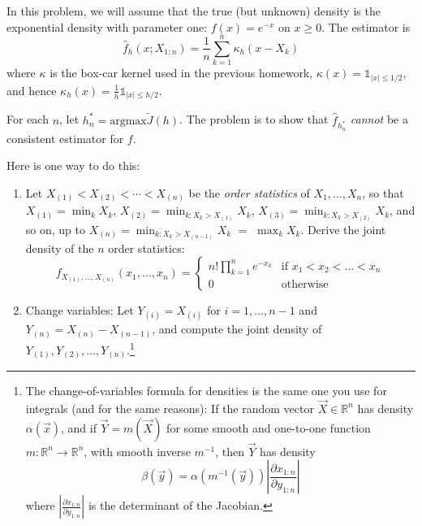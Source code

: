 \documentclass[11pt]{report}
\newcommand{\ind}{{\mathds{1}}}
\begin{document}
\begin{enumerate}[1.]
          In this problem, we will assume that the true (but unknown) density is the exponential density with parameter one: $f(x)=e^{-x}$ on $x \geq 0$. The estimator is
          \[
              \hat{f}_h(x;X_{1:n})=\frac{1}{n}\sum_{k=1}^n \kappa_h(x-X_k)
          \]
          where $\kappa$ is
          the box-car kernel used in the previous homework, $\kappa(x) = \ind_{|x|\leq 1/2}$, and hence
          $\kappa_h(x)=\frac{1}{h}\ind_{|x|\leq h/2}$.

          For each $n$, let $h_n^* = \text{argmax} \tilde{J}(h)$. The problem is to show that $\hat{f}_{h_n^*}$ {\em cannot} be a consistent estimator for $f$.

          Here is one way to do this:
          \begin{enumerate}

              \item Let $X_{(1)}<X_{(2)}<\cdots<X_{(n)}$ be the {\em order statistics}
                    of $X_1,\ldots,X_n$, so that $\displaystyle X_{(1)}=\min_k X_k$,
                    $\displaystyle X_{(2)}=\min_{k:X_k>X_{(1)}} X_k$,
                    $\displaystyle X_{(3)}=\min_{k:X_k>X_{(2)}} X_k$,
                    and so on, up to
                    $\displaystyle X_{(n)}=\min_{k:X_k>X_{(n-1)}} X_k$ $=$
                    $\displaystyle \max_k X_k$.
                    Derive the joint density of the $n$ order statistics:
                    $$
                        f_{X_{(1)},\ldots,X_{(n)}}(x_1,\ldots,x_n)=
                        \left\{
                        \begin{array}{ll}
                            n! \prod_{k=1}^n e^{-x_k} & \mbox{if $x_1<x_2<\ldots <x_n$} \\
                            0                         & \mbox{otherwise}
                        \end{array}
                        \right.
                    $$

              \item
                    Change variables: Let $Y_{(i)}=X_{(i)}$ for $i=1,\ldots,n-1$ and
                    $Y_{(n)}=X_{(n)}-X_{(n-1)}$, and
                    compute the joint density of $Y_{(1)},Y_{(2)},\ldots,Y_{(n)}$.\footnote{The change-of-variables formula for densities is the same one you use for integrals (and for the same reasons): If the random vector $\vec{X}\in\mathbb{R}^n$ has density
                        $\alpha(\vec{x})$, and if $\vec{Y} = m(\vec{X})$ for some smooth and one-to-one function $m:\mathbb{R}^n\to\mathbb{R}^n$, with smooth inverse
                        $m^{-1}$, then $\vec{Y}$ has density
                        \[
                            \beta(\vec{y}) = \alpha(m^{-1}(\vec{y})) \left|\frac{\partial x_{1:n}}{\partial y_{1:n}} \right|
                        \]
                        where $ \left|\frac{\partial x_{1:n}}{\partial y_{1:n}} \right|$ is the determinant of the Jacobian.
                    }



\end{enumerate}
\end{enumerate}
\end{document}
